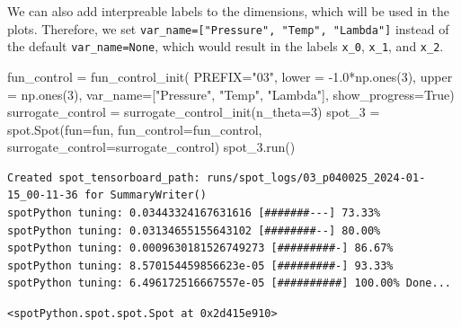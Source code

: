 \documentclass[
  letterpaper,
  DIV=11,
  numbers=noendperiod]{scrreprt}
\newenvironment{Shaded}{\begin{snugshade}}{\end{snugshade}}
\newcommand{\DecValTok}[1]{\textcolor[rgb]{0.68,0.00,0.00}{#1}}
\newcommand{\FloatTok}[1]{\textcolor[rgb]{0.68,0.00,0.00}{#1}}
\newcommand{\NormalTok}[1]{\textcolor[rgb]{0.00,0.23,0.31}{#1}}
\newcommand{\OperatorTok}[1]{\textcolor[rgb]{0.37,0.37,0.37}{#1}}
\newcommand{\StringTok}[1]{\textcolor[rgb]{0.13,0.47,0.30}{#1}}
\newcommand{\VariableTok}[1]{\textcolor[rgb]{0.07,0.07,0.07}{#1}}
\begin{document}
We can also add interpreable labels to the dimensions, which will be
used in the plots. Therefore, we set
\texttt{var\_name={[}"Pressure",\ "Temp",\ "Lambda"{]}} instead of the
default \texttt{var\_name=None}, which would result in the labels
\texttt{x\_0}, \texttt{x\_1}, and \texttt{x\_2}.

\begin{Shaded}
\begin{Highlighting}[]
\NormalTok{fun\_control }\OperatorTok{=}\NormalTok{ fun\_control\_init(}
\NormalTok{              PREFIX}\OperatorTok{=}\StringTok{"03"}\NormalTok{,}
\NormalTok{              lower }\OperatorTok{=} \OperatorTok{{-}}\FloatTok{1.0}\OperatorTok{*}\NormalTok{np.ones(}\DecValTok{3}\NormalTok{),}
\NormalTok{              upper }\OperatorTok{=}\NormalTok{ np.ones(}\DecValTok{3}\NormalTok{),}
\NormalTok{              var\_name}\OperatorTok{=}\NormalTok{[}\StringTok{"Pressure"}\NormalTok{, }\StringTok{"Temp"}\NormalTok{, }\StringTok{"Lambda"}\NormalTok{],}
\NormalTok{              show\_progress}\OperatorTok{=}\VariableTok{True}\NormalTok{)}
\NormalTok{surrogate\_control }\OperatorTok{=}\NormalTok{ surrogate\_control\_init(n\_theta}\OperatorTok{=}\DecValTok{3}\NormalTok{)}
\NormalTok{spot\_3 }\OperatorTok{=}\NormalTok{ spot.Spot(fun}\OperatorTok{=}\NormalTok{fun,}
\NormalTok{                  fun\_control}\OperatorTok{=}\NormalTok{fun\_control,}
\NormalTok{                  surrogate\_control}\OperatorTok{=}\NormalTok{surrogate\_control)}
\NormalTok{spot\_3.run()}
\end{Highlighting}
\end{Shaded}

\begin{verbatim}
Created spot_tensorboard_path: runs/spot_logs/03_p040025_2024-01-15_00-11-36 for SummaryWriter()
spotPython tuning: 0.03443324167631616 [#######---] 73.33% 
spotPython tuning: 0.03134655155643102 [########--] 80.00% 
spotPython tuning: 0.0009630181526749273 [#########-] 86.67% 
spotPython tuning: 8.570154459856623e-05 [#########-] 93.33% 
spotPython tuning: 6.496172516667557e-05 [##########] 100.00% Done...
\end{verbatim}

\begin{verbatim}
<spotPython.spot.spot.Spot at 0x2d415e910>
\end{verbatim}
\end{document}
